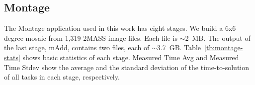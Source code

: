 \documentclass[preprint,12pt]{elsarticle}
\newcommand{\zhaonote}[1]{{\textcolor{cyan}{ ***Zhao:  #1 }}}
\newcommand{\zhaonote}[1]{}
\begin{document}
\subsection{Montage}\label{sec:Montage}

The Montage application used in this work has eight stages. We build a 6x6 degree mosaic from 1,319 2MASS image files. Each file is $\sim$2~MB. The output of the last stage, mAdd, contains
two files, each of $\sim$3.7~GB. 
Table~\ref{tb:montage-stats} shows basic statistics of each stage. 
Measured Time Avg and Measured Time Stdev show the average and the standard deviation of the time-to-solution of all tasks in each stage, respectively.

\end{document}
